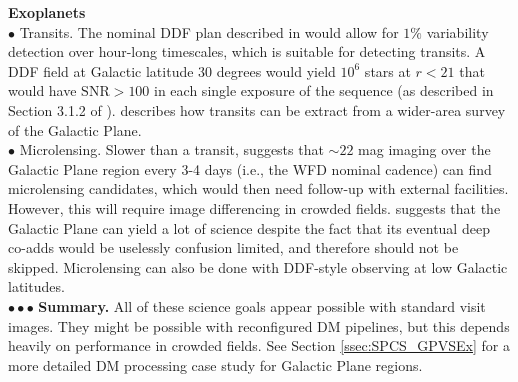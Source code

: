 \documentclass[DM,lsstdraft,toc]{lsstdoc}
\begin{document}
\noindent \textbf{Exoplanets} \\
$\bullet$ Transits. The nominal DDF plan described in \citep{2008arXiv0805.2366I} would allow for $1\%$ variability detection over hour-long timescales, which is suitable for detecting transits. A DDF field at Galactic latitude $30$ degrees would yield $10^6$ stars at $r<21$ that would have $\mathrm{SNR}>100$ in each single exposure of the sequence (as described in Section 3.1.2 of \citep{2008arXiv0805.2366I}). \citep{2013arXiv1304.3455G} describes how transits can be extract from a wider-area survey of the Galactic Plane.\\
$\bullet$ Microlensing.  Slower than a transit, \citep{2013arXiv1304.3455G} suggests that $\sim22$ mag imaging over the Galactic Plane region every 3-4 days (i.e., the WFD nominal cadence) can find microlensing candidates, which would then need follow-up with external facilities. However, this will require image differencing in crowded fields. \citep{2013arXiv1304.3455G} suggests that the Galactic Plane can yield a lot of science despite the fact that its eventual deep co-adds would be uselessly confusion limited, and therefore should not be skipped. Microlensing can also be done with DDF-style observing at low Galactic latitudes. \\
$\bullet \bullet \bullet$ \textbf{Summary.} All of these science goals appear possible with standard visit images. They might be possible with reconfigured DM pipelines, but this depends heavily on performance in crowded fields. See Section \ref{ssec:SPCS_GPVSEx} for a more detailed DM processing case study for Galactic Plane regions.
\end{document}
